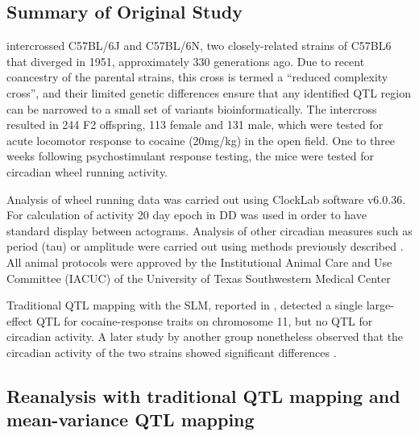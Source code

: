     \subsection{Summary of Original Study}

    \citet{Kumar2013} intercrossed C57BL/6J and C57BL/6N, two closely-related strains of C57BL6 that diverged in 1951, approximately 330 generations ago.
    Due to recent coancestry of the parental strains, this cross is termed a ``reduced complexity cross'', and their limited genetic differences ensure that any identified QTL region can be narrowed to a small set of variants bioinformatically.
    The intercross resulted in 244 F2 offspring, 113 female and 131 male, which were tested for acute locomotor response to cocaine (20mg/kg) in the open field.
    One to three weeks following psychostimulant response testing, the mice were tested for circadian wheel running activity.

    Analysis of wheel running data was carried out using ClockLab software v6.0.36.
    For calculation of activity 20 day epoch in DD was used in order to have standard display between actograms.
    Analysis of other circadian measures such as period (tau) or amplitude were carried out using methods previously described \citep{Shimomura2001}.
    All animal protocols were approved by the Institutional Animal Care and Use Committee (IACUC) of the University of Texas Southwestern Medical Center

    Traditional QTL mapping with the SLM, reported in \citet{Kumar2013}, detected a single large-effect QTL for cocaine-response traits on chromosome 11, but no QTL for circadian activity.
    A later study by another group nonetheless observed that the circadian activity of the two strains showed significant differences \citep{Banks2015}.


    \subsection{Reanalysis with traditional QTL mapping and mean-variance QTL mapping}

